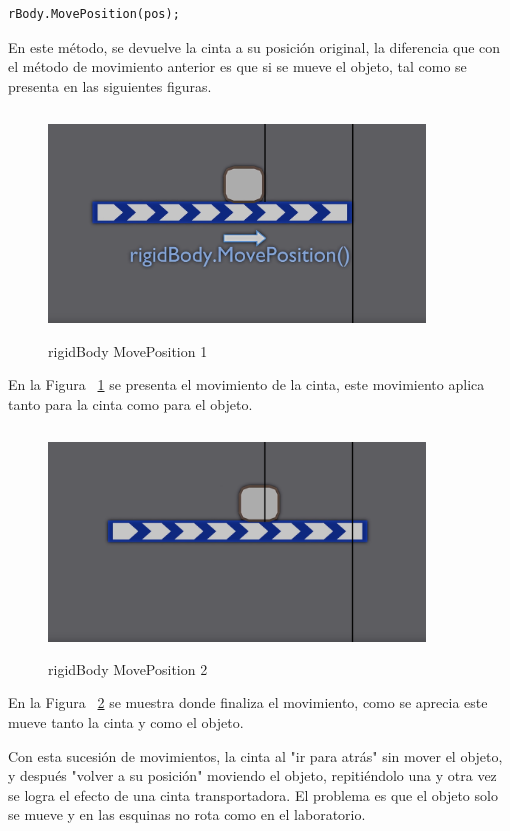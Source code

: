 \begin{lstlisting}[frame=single]
        rBody.MovePosition(pos);
\end{lstlisting}
En este método, se devuelve la cinta a su posición original, la diferencia que con el método de movimiento anterior es que si se mueve el objeto, tal como se presenta en las siguientes figuras.
\begin{figure}[h]
\centering
\includegraphics[width=10cm, height=6cm]{figures/rbodymove1.png}
\caption{rigidBody MovePosition 1}
\label{fig:rbodymove1}
\end{figure}

En la Figura ~\ref{fig:rbodymove1} se presenta el movimiento de la cinta, este movimiento aplica tanto para la cinta como para el objeto.

\clearpage

\begin{figure}[h]
\centering
\includegraphics[width=10cm, height=6cm]{figures/rbodymove2.png}
\caption{rigidBody MovePosition 2}
\label{fig:rbodymove2}
\end{figure}

En la Figura ~\ref{fig:rbodymove2} se muestra donde finaliza el movimiento, como se aprecia este mueve tanto la cinta y como el objeto.

Con esta sucesión de movimientos, la cinta al "ir para atrás" sin mover el objeto, y después "volver a su posición" moviendo el objeto, repitiéndolo una y otra vez se logra el efecto de una cinta transportadora. El problema es que el objeto solo se mueve y en las esquinas no rota como en el laboratorio.
\clearpage
